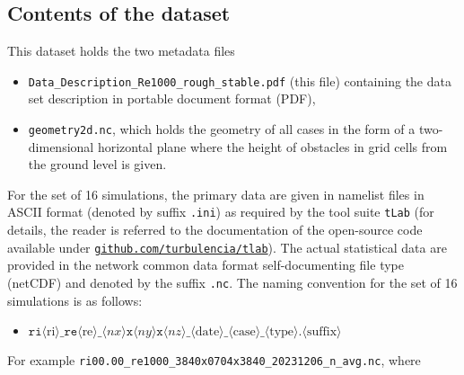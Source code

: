 \documentclass[11pt]{article}
\begin{document}
\subsection{Contents of the dataset }
This dataset holds the two metadata files 
\begin{itemize} 
    \item \texttt{Data\_Description\_Re1000\_rough\_stable.pdf} (this file) containing the data set description in portable document format (PDF), 
    \item \texttt{geometry2d.nc}, which holds the geometry of all cases in the form of a two-dimensional horizontal plane where the height of obstacles in grid cells from the ground level is given. 
\end{itemize} 
For the set of 16 simulations, the primary data are given in namelist files in ASCII format (denoted by suffix \texttt{.ini}) as required by the tool suite \texttt{tLab} (for details, the reader is referred to the documentation of the open-source code available under \href{https://github.com/turbulencia/tlab}{\texttt{github.com/turbulencia/tlab}}). The actual statistical data are provided in the network common data format self-documenting file type (netCDF) and denoted by the suffix \texttt{.nc}. The naming convention for the set of 16 simulations is as follows: 
\begin{itemize}
\item[] $\texttt{ri} \langle \text{ri}\rangle \texttt{\_}
\texttt{re} \langle \text{re}\rangle \texttt{\_}
\langle nx\rangle \texttt{x} \langle ny \rangle \texttt{x} \langle nz\rangle  \texttt{\_}
\langle \text{date}\rangle\texttt{\_}
\langle \text{case}\rangle\texttt{\_}
\langle \text{type}\rangle\texttt{.}
\langle \text{suffix}\rangle$
\end{itemize}
For example \texttt{ri00.00\_re1000\_3840x0704x3840\_20231206\_n\_avg.nc}, where
\end{document}
